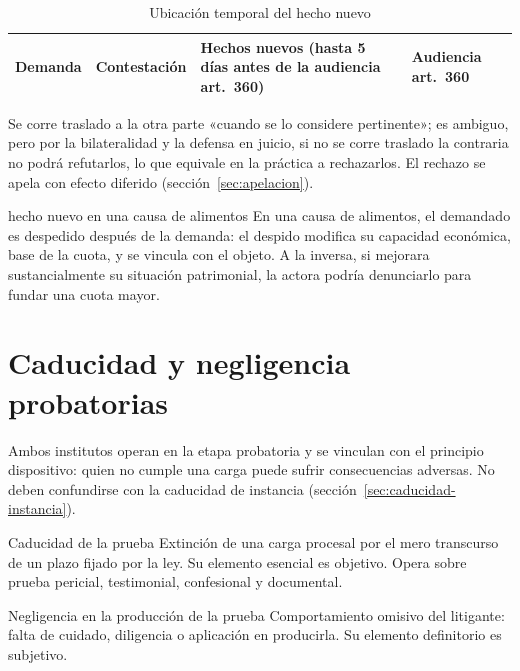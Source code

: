 \documentclass[12pt,oneside]{book}
\begin{document}
\begin{table}[H]
\centering
\caption{Ubicación temporal del hecho nuevo}
\begin{tabularx}{\textwidth}{>{\centering\arraybackslash}X >{\centering\arraybackslash}X >{\centering\arraybackslash\bfseries}X >{\centering\arraybackslash}X}
\toprule
Demanda & Contestación & Hechos nuevos (hasta 5 días antes de la audiencia art.~360) & Audiencia art.~360 \\
\bottomrule
\end{tabularx}
\end{table}

Se corre traslado a la otra parte «cuando se lo considere pertinente»; es ambiguo, pero por la bilateralidad y la defensa en juicio, si no se corre traslado la contraria no podrá refutarlos, lo que equivale en la práctica a rechazarlos. El rechazo se apela con efecto diferido (sección~\ref{sec:apelacion}).

\begin{ejemplo}{hecho nuevo en una causa de alimentos}
En una causa de alimentos, el demandado es despedido después de la demanda: el despido modifica su capacidad económica, base de la cuota, y se vincula con el objeto. A la inversa, si mejorara sustancialmente su situación patrimonial, la actora podría denunciarlo para fundar una cuota mayor.
\end{ejemplo}

\section{Caducidad y negligencia probatorias}\label{sec:caducidad-prueba}

Ambos institutos operan en la etapa probatoria y se vinculan con el principio dispositivo: quien no cumple una carga puede sufrir consecuencias adversas. No deben confundirse con la caducidad de instancia (sección~\ref{sec:caducidad-instancia}).

\begin{definicion}{Caducidad de la prueba}
Extinción de una carga procesal por el mero transcurso de un plazo fijado por la ley. Su elemento esencial es objetivo. Opera sobre prueba pericial, testimonial, confesional y documental.
\end{definicion}

\begin{definicion}{Negligencia en la producción de la prueba}
Comportamiento omisivo del litigante: falta de cuidado, diligencia o aplicación en producirla. Su elemento definitorio es subjetivo.
\end{definicion}
\end{document}
